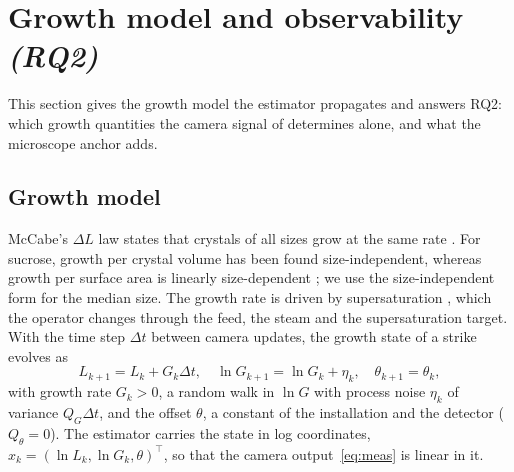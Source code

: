 \section{Growth model and observability \emph{(RQ2)}}\label{sec:growth}

This section gives the growth model the estimator propagates and answers RQ2: which growth quantities the camera
signal of  determines alone, and what the microscope anchor adds.

\subsection{Growth model}\label{sec:mechanism}

McCabe's $\Delta L$ law states that crystals of all sizes grow at the same rate \citep{McCabe1929,RandolphLarson1988}.
For sucrose, growth per crystal volume has been found size-independent, whereas growth per surface area is linearly
size-dependent \citep{Martins2007}; we use the size-independent form for the median size. The growth rate is driven by
supersaturation \citep{QuintanaHernandez2004}, which the operator changes through the feed, the steam and the
supersaturation target. With the time step $\Delta t$ between camera updates, the growth state of a strike evolves as
\begin{equation}\label{eq:growth}
L_{k+1} = L_k + G_k \Delta t, \quad \ln G_{k+1} = \ln G_k + \eta_k, \quad \theta_{k+1} = \theta_k,
\end{equation}
with growth rate $G_k > 0$, a random walk in $\ln G$ with process noise $\eta_k$ of variance $Q_G \Delta t$, and the
offset $\theta$, a constant of the installation and the detector ($Q_\theta = 0$). The estimator carries the state in
log coordinates, $x_k = (\ln L_k, \ln G_k, \theta)^\top$, so that the camera output~\eqref{eq:meas} is linear in it.

